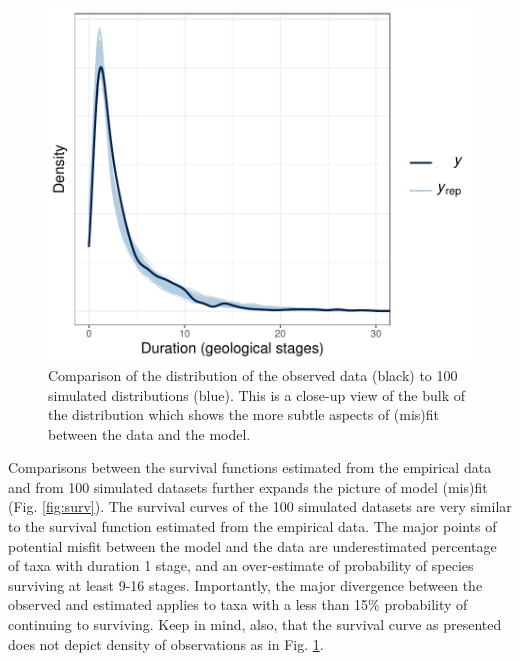 \documentclass[11pt]{article}
\begin{document}
\begin{figure}[ht]
  \centering
  \includegraphics[height = 0.5\textheight,width=\textwidth,keepaspectratio=true]{figure/ppc_dens_zoom_cweib_cens}
  \caption{ Comparison of the distribution of the observed data (black) to 100 simulated distributions (blue). This is a close-up view of the bulk of the distribution which shows the more subtle aspects of (mis)fit between the data and the model. }
  \label{fig:dens_overlay_zoom}
\end{figure}


Comparisons between the survival functions estimated from the empirical data and from 100 simulated datasets further expands the picture of model (mis)fit (Fig. \ref{fig:surv}). The survival curves of the 100 simulated datasets are very similar to the survival function estimated from the empirical data. The major points of potential misfit between the model and the data are underestimated percentage of taxa with duration 1 stage, and an over-estimate of probability of species surviving at least 9-16 stages. Importantly, the major divergence between the observed and estimated applies to taxa with a less than 15\% probability of continuing to surviving. Keep in mind, also, that the survival curve as presented does not depict density of observations as in Fig. \ref{fig:dens_overlay_zoom}.
\end{document}
